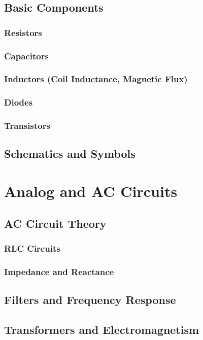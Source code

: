 \documentclass[11pt]{article}
\begin{document}
\subsection{Basic Components} \label{subsec:basic_components}
\subsubsection{Resistors}
\subsubsection{Capacitors}
\subsubsection{Inductors (Coil Inductance, Magnetic Flux)}
\subsubsection{Diodes}
\subsubsection{Transistors}
\subsection{Schematics and Symbols} \label{subsec:schematics_symbols}

\section{Analog and AC Circuits} \label{sec:analog_ac}
\subsection{AC Circuit Theory} \label{subsec:ac_circuit_theory}
\subsubsection{RLC Circuits}
\subsubsection{Impedance and Reactance}
\subsection{Filters and Frequency Response} \label{subsec:filters}
\subsection{Transformers and Electromagnetism} \label{subsec:transformers}
\end{document}
